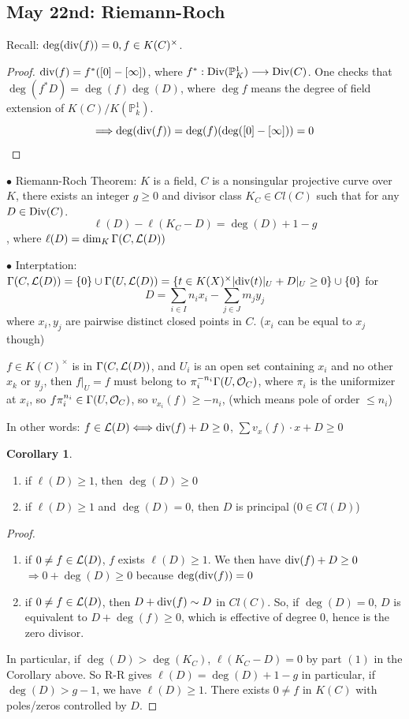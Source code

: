 \documentclass[11pt]{article}
\theoremstyle{definition}
\newtheorem{cor}[thm]{Corollary}
\newcommand{\proj}{\mathbb P}
\newcommand{\call}{{\cal L}}
\newcommand{\calo}{{\cal O}}
\renewcommand{\div}{\textnormal{div}}
\newcommand{\Div}{\textnormal{Div}}
\newcommand{\Lrta}{\Longrightarrow}
\newcommand{\lrta}{\longrightarrow}
\newcommand{\Llrta}{\Longleftrightarrow}
\begin{document}
\subsection{May 22nd: Riemann-Roch}
Recall: $\deg(\div(f))=0, f\in K(C)^\times$.
\begin{proof}
$\div(f)=f^*([0]-[\infty])$, where $f^*: \Div(\proj^1_K)\lrta \Div(C)$. One checks that $\deg(f^*D)=\deg (f)\deg(D)$, where $\deg f$ means the degree of field extension of $K(C)/K(\proj^1_k)$.
$$
\Lrta \deg(\div(f))=\deg(f)(\deg([0]-[\infty]))=0
$$
\end{proof}

$\bullet$ Riemann-Roch Theorem: $K$ is a field, $C$ is a nonsingular projective curve over $K$, there exists an integer $g\geq 0$ and divisor class $K_C\in Cl(C)$ such that for any $D\in \Div(C)$.
$$
\ell(D)-\ell(K_C-D)=\deg(D)+1-g
$$
, where $\ell(D)=\dim_K\Gamma(C,\call(D))$

$\bullet$ Interptation: $\Gamma(C,\call(D))=\{0\}\cup \Gamma(U,\call(D))=\{t\in K(X)^\times| \div(t)|_U+D|_U \geq 0\}\cup \{0\}$ for 
$$
D=\sum_{i\in I} n_i x_i-\sum_{j\in J} m_j y_j
$$
where $x_i,y_j$ are pairwise distinct closed points in $C$. ($x_i$ can be equal to $x_j$ though)

$f\in K(C)^\times$ is in $\Gamma(C,\call(D))$, and $U_i$ is an open set containing $x_i$ and no other $x_k$ or $y_j$, then $f|_U=f$ must belong to $\pi_i^{-n_i}\Gamma(U,\calo_C)$, where $\pi_i$ is the uniformizer at $x_i$, so $f\pi_i^{n_i}\in \Gamma(U,\calo_C)$, so $v_{x_i}(f)\geq -n_i$, (which means pole of order $\leq n_i$)

In other words: $f\in \call(D)\Llrta \div(f)+D\geq 0$, $\sum v_x(f)\cdot x+D\geq 0$

\begin{cor}\label{chap7cor:principal_divisor_length1_deg0}\ 
\begin{enumerate}[label=(\arabic*)]
\item if $\ell(D)\geq 1$, then $\deg(D)\geq 0$
\item if $\ell(D)\geq 1$ and $\deg(D)=0$, then $D$ is principal ($0\in Cl(D)$)
\end{enumerate}
\end{cor}
\begin{proof}\ 
\begin{enumerate}[label=(\arabic*)]
\item if $0\neq f\in \call(D)$, $f$ exists $\ell(D)\geq 1$. We then have $\div(f)+D\geq 0$ $\Lrta 0+\deg(D)\geq 0$ because $\deg(\div(f))=0$
\item if $0\neq f\in \call(D)$, then $D+\div(f)\sim D$ in $Cl(C)$. So, if $\deg(D)=0$, $D$ is equivalent to $D+\deg(f)\geq 0$, which is effective of degree $0$, hence is the zero divisor.
\end{enumerate}

In particular, if $\deg(D)>\deg(K_C)$, $\ell(K_C-D)=0$ by part $(1)$ in the Corollary above. So R-R
 gives $\ell(D)=\deg(D)+1-g$ in particular, if $\deg(D)>g-1$,  we have $\ell(D)\geq 1$. There exists $0\neq f$ in $K(C)$ with poles/zeros controlled by $D$.
 \end{proof}
\end{document}
